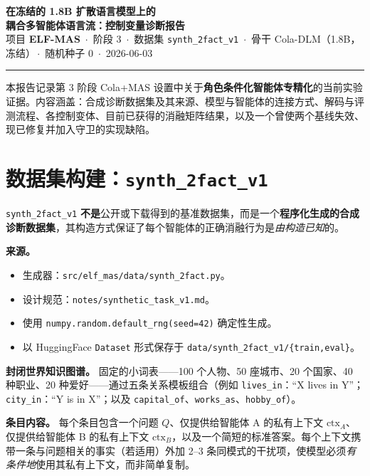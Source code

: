 \documentclass[10pt]{article}
\newcommand{\ctxa}{$\text{ctx}_A$}
\newcommand{\ctxb}{$\text{ctx}_B$}
\begin{document}
\begin{center}
{\Large\bfseries 在冻结的 1.8B 扩散语言模型上的\\[2pt]
耦合多智能体语言流：控制变量诊断报告}\\[6pt]
{\small 项目 \textbf{ELF-MAS} \,$\cdot$\, 阶段 3 \,$\cdot$\, 数据集 \texttt{synth\_2fact\_v1}
\,$\cdot$\, 骨干 Cola-DLM（1.8B，冻结）\,$\cdot$\, 随机种子 0 \,$\cdot$\, 2026-06-03}
\end{center}
\vspace{2pt}
\hrule
\vspace{6pt}

本报告记录第 3 阶段 Cola+MAS 设置中关于\textbf{角色条件化智能体专精化}的当前实验证据。内容涵盖：合成诊断数据集及其来源、模型与智能体的连接方式、解码与评测流程、各控制变体、目前已获得的消融矩阵结果，以及一个曾使两个基线失效、现已修复并加入守卫的实现缺陷。

\section{数据集构建：\texttt{synth\_2fact\_v1}}
\texttt{synth\_2fact\_v1} \textbf{不是}公开或下载得到的基准数据集，而是一个\textbf{程序化生成的合成诊断数据集}，其构造方式保证了每个智能体的正确消融行为是\emph{由构造已知}的。

\noindent\textbf{来源。}
\begin{itemize}
\item 生成器：\texttt{src/elf\_mas/data/synth\_2fact.py}。
\item 设计规范：\texttt{notes/synthetic\_task\_v1.md}。
\item 使用 \texttt{numpy.random.default\_rng(seed=42)} 确定性生成。
\item 以 HuggingFace \texttt{Dataset} 形式保存于 \texttt{data/synth\_2fact\_v1/\{train,eval\}}。
\end{itemize}

\noindent\textbf{封闭世界知识图谱。} 固定的小词表——100 个人物、50 座城市、20 个国家、40 种职业、20 种爱好——通过五条关系模板组合（例如 \texttt{lives\_in}：``X lives in Y''；\texttt{city\_in}：``Y is in X''；以及 \texttt{capital\_of}、\texttt{works\_as}、\texttt{hobby\_of}）。

\noindent\textbf{条目内容。} 每个条目包含一个问题 $Q$、仅提供给智能体 A 的私有上下文 \ctxa{}、仅提供给智能体 B 的私有上下文 \ctxb{}，以及一个简短的标准答案。每个上下文携带一条与问题相关的事实（若适用）外加 2--3 条同模式的干扰项，使模型必须\emph{有条件地}使用其私有上下文，而非简单复制。
\end{document}
